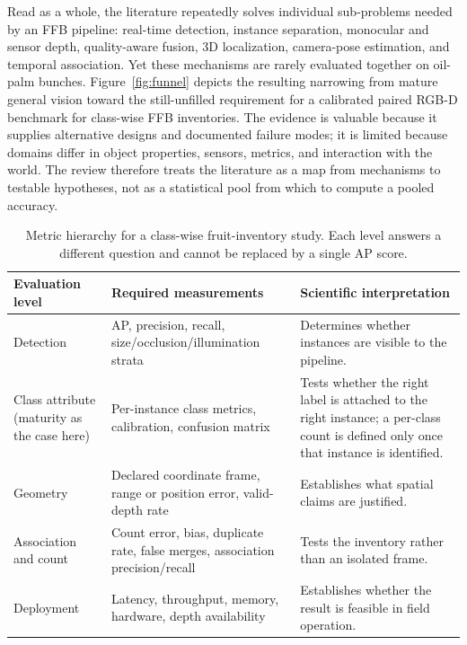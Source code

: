 Read as a whole, the literature repeatedly solves individual sub-problems needed by an FFB pipeline: real-time detection, instance separation, monocular and sensor depth, quality-aware fusion, 3D localization, camera-pose estimation, and temporal association. Yet these mechanisms are rarely evaluated together on oil-palm bunches. Figure~\ref{fig:funnel} depicts the resulting narrowing from mature general vision toward the still-unfilled requirement for a calibrated paired RGB-D benchmark for class-wise FFB inventories. The evidence is valuable because it supplies alternative designs and documented failure modes; it is limited because domains differ in object properties, sensors, metrics, and interaction with the world. The review therefore treats the literature as a map from mechanisms to testable hypotheses, not as a statistical pool from which to compute a pooled accuracy.

\begin{table}[t]
\centering\small
\caption{Metric hierarchy for a class-wise fruit-inventory study. Each level answers a different question and cannot be replaced by a single AP score.}
\label{tab:metrics}
\begin{tabular}{p{}p{}p{}}
\toprule
Evaluation level & Required measurements & Scientific interpretation \\
\midrule
Detection & AP, precision, recall, size/occlusion/illumination strata & Determines whether instances are visible to the pipeline. \\
Class attribute (maturity as the case here) & Per-instance class metrics, calibration, confusion matrix & Tests whether the right label is attached to the right instance; a per-class count is defined only once that instance is identified. \\
Geometry & Declared coordinate frame, range or position error, valid-depth rate & Establishes what spatial claims are justified. \\
Association and count & Count error, bias, duplicate rate, false merges, association precision/recall & Tests the inventory rather than an isolated frame. \\
Deployment & Latency, throughput, memory, hardware, depth availability & Establishes whether the result is feasible in field operation. \\
\bottomrule
\end{tabular}
\end{table}



